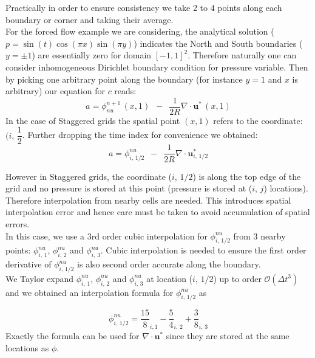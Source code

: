 Practically in order to ensure consistency we take 2 to 4 points along each boundary or corner and taking their average. \\

For the forced flow example we are considering, the analytical solution ($p = \sin(t)\cos(\pi x)\sin(\pi y)$) indicates the North and South boundaries ($y=\pm 1$) are essentially zero for domain $[-1,1]^2$. Therefore naturally one can consider inhomogeneous Dirichlet boundary condition for pressure variable. Then by picking one arbitrary point along the boundary (for instance $y=1$ and $x$ is arbitrary) our equation for $c$ reads:
\begin{equation*}
a = \phi^{n+1}_{nu}\,(x,1) \,\,\,-\,\,\, \dfrac{1}{2R} \nabla \cdot \textbf{u}^*\,(x,1)
\end{equation*}
In the case of Staggered grids the spatial point $(x,1)$ refers to the coordinate: $(i,\,\dfrac{1}{2}$. Further dropping the time index for convenience we obtained:
\begin{equation*}
a = \phi^{nu}_{i,\,1/2} \,\,\,-\,\,\, \dfrac{1}{2R} \nabla \cdot \textbf{u}^*_{i,\,1/2}
\end{equation*}

However in Staggered grids, the coordinate ($i,\,1/2$) is along the top edge of the grid and no pressure is stored at this point (pressure is stored at ($i,\,j$) locations). Therefore interpolation from nearby cells are needed. This introduces spatial interpolation error and hence care must be taken to avoid accumulation of spatial errors.\\

In this case, we use a 3rd order cubic interpolation for $\phi^{nu}_{i,\,1/2}$ from 3 nearby points: $\phi^{nu}_{i,\,1}$, $\phi^{nu}_{i,\,2}$ and $\phi^{nu}_{i,\,3}$. Cubic interpolation is needed to ensure the first order derivative of $\phi^{nu}_{i,\,1/2}$ is also second order accurate along the boundary.\\
We Taylor expand $\phi^{nu}_{i,\,1}$, $\phi^{nu}_{i,\,2}$ and $\phi^{nu}_{i,\,3}$ at location ($i,\,1/2$) up to order $\mathcal{O}(\Delta t^3)$ and we obtained an interpolation formula for $\phi^{nu}_{i,\,1/2}$ as

\begin{equation}
\phi^{nu}_{i,\,1/2} = \dfrac{15}{8}_{i,1} - \dfrac{5}{4}_{i,\,2}+\dfrac{3}{8}_{i,\,3}
\end{equation}
Exactly the formula can be used for $\nabla \cdot \textbf{u}^*$ since they are stored at the same locations as $\phi$.\\

